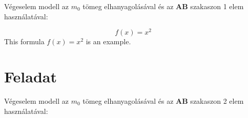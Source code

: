 \documentclass{article}
\begin{document}
	Végeselem modell az $m_{0}$ tömeg elhanyagolásával és az \textbf{AB} szakaszon 1 elem használatával:
	\begin{figure}[h!]		
		\begin{center}	
		\end{center}	
	\caption{}
	\end{figure}
	
	
	\begin{equation}
	f(x)=x^2
	\end{equation}
	This formula $f(x) = x^2$ is an example.
	
	\section{Feladat}
		
	Végeselem modell az $m_{0}$ tömeg elhanyagolásával és az \textbf{AB} szakaszon 2 elem használatával:
	
\end{document}
